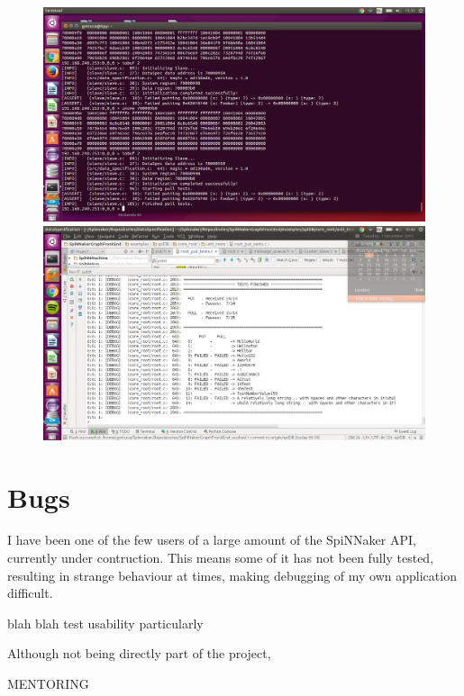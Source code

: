 \begin{figure}
  \centering
  \includegraphics[width=1.3\linewidth, natwidth=1366, natheight=768]{images/debugging.png}
  \label{fig:debugging}
  \centering
  \includegraphics[width=1.3\linewidth, natwidth=1366, natheight=768]{images/testing.png}
  \label{fig:testing}
\end{figure}


\section{Bugs}
I have been one of the few users of a large amount of the SpiNNaker API, currently under contruction. This means some of it has not been fully tested, resulting in strange behaviour at times, making debugging of my own application difficult.

blah blah test usability
particularly

Although not being directly part of the project, 

MENTORING

